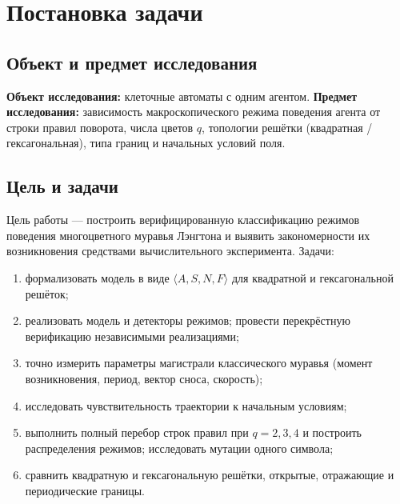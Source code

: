 \documentclass[12pt,a4paper]{article}
\begin{document}
	\tableofcontents
	\newpage
	
	\section{Постановка задачи}
	
	\subsection{Объект и предмет исследования}
	\textbf{Объект исследования:} клеточные автоматы с одним агентом. \textbf{Предмет исследования:} зависимость макроскопического режима поведения агента от строки правил поворота, числа цветов $q$, топологии решётки (квадратная / гексагональная), типа границ и начальных условий поля.
	
	\subsection{Цель и задачи}
	Цель работы --- построить верифицированную классификацию режимов поведения многоцветного муравья Лэнгтона и выявить закономерности их возникновения средствами вычислительного эксперимента. Задачи:
	\begin{enumerate}
		\item формализовать модель в виде $\langle A,S,N,F\rangle$ для квадратной и гексагональной решёток;
		\item реализовать модель и детекторы режимов; провести перекрёстную верификацию независимыми реализациями;
		\item точно измерить параметры магистрали классического муравья (момент возникновения, период, вектор сноса, скорость);
		\item исследовать чувствительность траектории к начальным условиям;
		\item выполнить полный перебор строк правил при $q=2,3,4$ и построить распределения режимов; исследовать мутации одного символа;
		\item сравнить квадратную и гексагональную решётки, открытые, отражающие и периодические границы.
	\end{enumerate}
	
\end{document}
